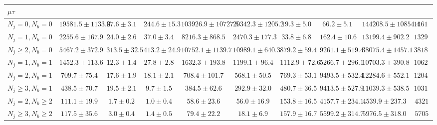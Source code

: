 \begin{tabular}{l|ccccccc|cc}
        \hline
        \multicolumn{10}{l}{$\mu\tau$} \\
        \hline
        $N_{j} = 0, N_{b} = 0$          & $19581.5 \pm 1133.6$ & $27.6 \pm 3.1$   & $244.6 \pm 15.3$ & $103926.9 \pm 10727.5$ & $20342.3 \pm 1205.2$ & $19.3 \pm 5.0$    & $66.2 \pm 5.1$     & $144208.5 \pm 10854.4$ & $146128$ \\
        $N_{j} = 1, N_{b} = 0$          & $2255.6 \pm 167.9$   & $24.0 \pm 2.6$   & $37.0 \pm 3.4$   & $8216.3 \pm 868.5$     & $2470.3 \pm 177.3$   & $33.8 \pm 6.8$    & $162.4 \pm 10.6$   & $13199.4 \pm 902.2$    & $13293$  \\
        $N_{j} \geq 2, N_{b} = 0$       & $5467.2 \pm 372.9$   & $313.5 \pm 32.5$ & $413.2 \pm 24.9$ & $10752.1 \pm 1139.7$   & $10989.1 \pm 640.3$  & $879.2 \pm 59.4$  & $9261.1 \pm 519.4$ & $38075.4 \pm 1457.1$   & $38184$  \\
        $N_{j} = 1, N_{b} = 1$          & $1452.3 \pm 113.6$   & $12.3 \pm 1.4$   & $27.8 \pm 2.8$   & $1632.3 \pm 193.8$     & $1199.1 \pm 96.4$    & $1112.9 \pm 72.6$ & $5266.7 \pm 296.1$ & $10703.3 \pm 390.8$    & $10628$  \\
        $N_{j} = 2, N_{b} = 1$          & $709.7 \pm 75.4$     & $17.6 \pm 1.9$   & $18.1 \pm 2.1$   & $708.4 \pm 101.7$      & $568.1 \pm 50.5$     & $769.3 \pm 53.1$  & $9493.5 \pm 532.4$ & $12284.6 \pm 552.1$    & $12048$  \\
        $N_{j} \geq 3, N_{b} = 1$       & $438.5 \pm 70.7$     & $19.5 \pm 2.1$   & $9.7 \pm 1.5$    & $384.5 \pm 62.6$       & $292.9 \pm 32.0$     & $480.7 \pm 36.5$  & $9413.5 \pm 527.9$ & $11039.3 \pm 538.5$    & $10314$  \\
        $N_{j} = 2, N_{b} \geq 2$       & $111.1 \pm 19.9$     & $1.7 \pm 0.2$    & $1.0 \pm 0.4$    & $58.6 \pm 23.6$        & $56.0 \pm 16.9$      & $153.8 \pm 16.5$  & $4157.7 \pm 234.1$ & $4539.9 \pm 237.3$     & $4321$   \\
        $N_{j} \geq 3, N_{b} \geq 2$    & $117.5 \pm 35.6$     & $3.0 \pm 0.4$    & $1.4 \pm 0.5$    & $79.4 \pm 22.2$        & $18.1 \pm 6.9$       & $157.9 \pm 16.7$  & $5599.2 \pm 314.7$ & $5976.5 \pm 318.0$     & $5705$   \\
        \hline
    \end{tabular}